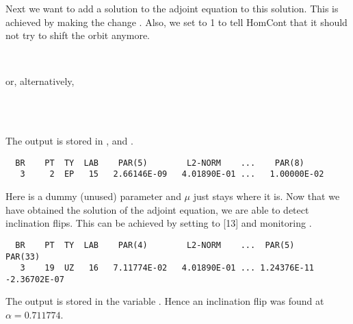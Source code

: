 \documentclass[12pt]{report}
\begin{document}
Next we want to add a solution to the adjoint equation to this
solution. This is achieved by making the change .
Also, we set  to 1 to tell 
{\cal HomCont} that it should not try to shift the orbit anymore.
\begin{center}
 \\
\end{center}
or, alternatively,
\begin{center}
\\
\\
\end{center}
The output is stored in ,   and .
\begin{verbatim}
  BR    PT  TY  LAB    PAR(5)        L2-NORM    ...    PAR(8)     
   3     2  EP   15   2.66146E-09   4.01890E-01 ...   1.00000E-02
\end{verbatim}
Here  is a dummy (unused) parameter and $\mu$ just stays where
it is. Now that we have obtained the solution of the adjoint equation,
we are able to detect inclination flips. This can be achieved by
setting  to [13] and monitoring .
\begin{center}
\end{center} 
\begin{verbatim}
  BR    PT  TY  LAB    PAR(4)        L2-NORM    ...  PAR(5)        PAR(33)
   3    19  UZ   16   7.11774E-02   4.01890E-01 ... 1.24376E-11  -2.36702E-07
\end{verbatim}   
The output is stored in the \python variable .
Hence an inclination flip was found at $\alpha=0.711774$.
\end{document}
